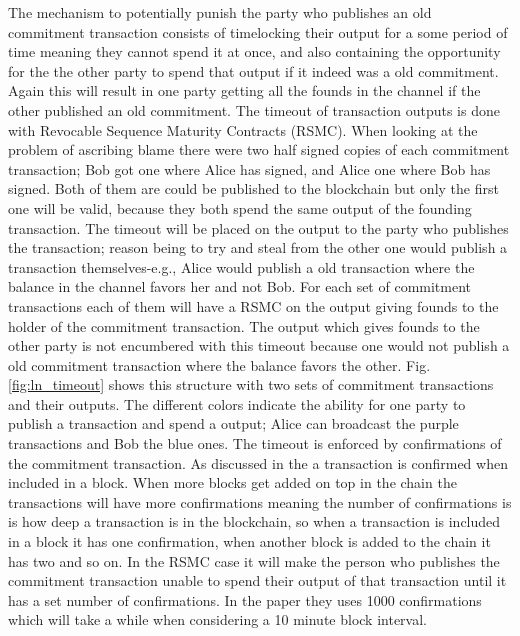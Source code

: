 The mechanism to potentially punish the party who publishes an old commitment transaction consists of timelocking their output for a some period of time meaning they cannot spend it at once, and also containing the opportunity for the the other party to spend that output if it indeed was a old commitment. Again this will result in one party getting all the founds in the channel if the other published an old commitment. The timeout of transaction outputs is done with Revocable Sequence Maturity Contracts (RSMC). When looking at the problem of ascribing blame there were two half signed copies of each commitment transaction; Bob got one where Alice has signed, and Alice one where Bob has signed. Both of them are could be published to the blockchain but only the first one will be valid, because they both spend the same output of the founding transaction. The timeout will be placed on the output to the party who publishes the transaction; reason being to try and steal from the other one would publish a transaction themselves-e.g., Alice would publish a old transaction where the balance in the channel favors her and not Bob. For each set of commitment transactions each of them will have a RSMC on the output giving founds to the holder of the commitment transaction. The output which gives founds to the other party is not encumbered with this timeout because one would not publish a old commitment transaction where the balance favors the other. 
Fig.\ref{fig:ln_timeout} shows this structure with two sets of commitment transactions and their outputs. The different colors indicate the ability for one party to publish a transaction and spend a output; Alice can broadcast the purple transactions and Bob the blue ones. The timeout is enforced by confirmations of the commitment transaction. As discussed in the  a transaction is confirmed when included in a block. When more blocks get added on top in the chain the transactions will have more confirmations meaning the number of confirmations is is how deep a transaction is in the blockchain, so when a transaction is included in a block it has one confirmation, when another block is added to the chain it has two and so on\cite{antonopoulos2017mastering}. In the RSMC case it will make the person who publishes the commitment transaction unable to spend their output of that transaction until it has a set number of confirmations. In the paper they uses 1000 confirmations which will take a while when considering a 10 minute block interval.

